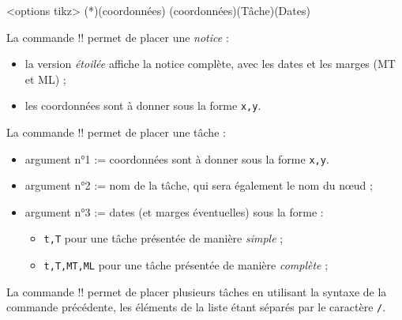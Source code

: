 \documentclass[french,a4paper,11pt]{article}
\begin{document}
{{\begin{DemoCode}
\begin{GrapheMPM}[clés]<options tikz>
	\MPMPlaceNotice(*)(coordonnées)
	\MPMPlaceTache(coordonnées)(Tâche)(Dates)
\end{GrapheMPM}
\end{DemoCode}

\begin{tipblock}
La commande \motcletex!\MPMPlaceNotice! permet de placer une \textit{notice} :

\begin{itemize}
	\item la version \textit{étoilée} affiche la notice complète, avec les dates et les marges (MT et ML) ;
	\item les coordonnées sont à donner sous la forme \verb!x,y!.
\end{itemize}
\vspace*{-\baselineskip}\leavevmode
\end{tipblock}

\begin{tipblock}
La commande \motcletex!\MPMPlaceTache! permet de placer une tâche :

\begin{itemize}
	\item argument n°1 := coordonnées sont à donner sous la forme \verb!x,y!.
	\item argument n°2 := nom de la tâche, qui sera également le nom du nœud ;
	\item argument n°3 := dates (et marges éventuelles) sous la forme :
	\begin{itemize}
		\item \verb!t,T! pour une tâche présentée de manière \textit{simple} ;
		\item \verb!t,T,MT,ML! pour une tâche présentée de manière \textit{complète} ;
	\end{itemize}
\end{itemize}
\vspace*{-\baselineskip}\leavevmode
\end{tipblock}

\begin{tipblock}
La commande \motcletex!\MPMPlaceTaches! permet de placer plusieurs tâches en utilisant la syntaxe de la commande précédente, les éléments de la liste étant séparés par le caractère \verb!/!.
\end{tipblock}

}}
\end{document}
